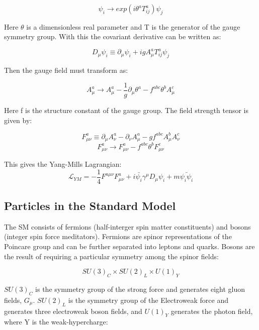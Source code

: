 \begin{equation}
\psi_{i} \rightarrow exp(i\theta^{a}T^{a}_{ij})\psi_{j}
\end{equation}

Here $\theta$ is a dimensionless real parameter and T is the generator of the gauge symmetry group. With this the covariant derivative can be written as:

\begin{equation}
D_{\mu}\psi_{i} \equiv \partial_{\mu}\psi_{i} + igA^{a}_{\mu}T^{a}_{ij}\psi_{j}
\end{equation}

Then the gauge field must transform as:

\begin{equation}
A^{a}_{\mu} \rightarrow A^{a}_{\mu} - \frac{1}{g}\partial_{\mu}\theta^{a} - f^{abc} \theta^{b} A_{\mu}^{c}
\end{equation}

Here f is the structure constant of the gauge group. The field strength tensor is given by:

\begin{equation}
F^{a}_{\mu\nu} \equiv \partial_{\mu}A^{a}_{\nu} - \partial_{\nu}A^{a}_{\mu} - gf^{abc}A^{b}_{\mu}A^{c}_{\nu}
\end{equation}
\begin{equation}
F^{a}_{\mu\nu} \rightarrow F^{a}_{\mu\nu} - f^{abc} \theta^{b}F^{c}_{\mu\nu}
\end{equation}

This gives the Yang-Mills Lagrangian:
\begin{equation}
\mathcal{L}_{YM}= -\frac{1}{4}F^{a\mu\nu}F^{a}_{\mu\nu}+i\bar{\psi_{i}}\gamma^{\mu}D_{\mu}\psi_{i}+m\bar{\psi_{i}\psi_{i}}
\end{equation}
\subsection{Particles in the Standard Model}
The SM consists of fermions (half-interger spin matter constituents) and bosons (integer spin force meditators). Fermions are spinor representations of the Poincare group and can be further separated into leptons and quarks. Bosons are the result of requiring a particular symmetry among the spinor fields:

\begin{equation}
SU(3)_{C} \times SU(2)_{L} \times U(1)_{Y}
\end{equation}

$SU(3)_{C}$ is the symmetry group of the strong force and generates eight gluon fields, $G_{\mu}$. $SU(2)_{L}$ is the symmetry group of the Electroweak force and generates three electroweak boson fields, and $U(1)_{Y}$ generates the photon field, where Y is the weak-hypercharge:


